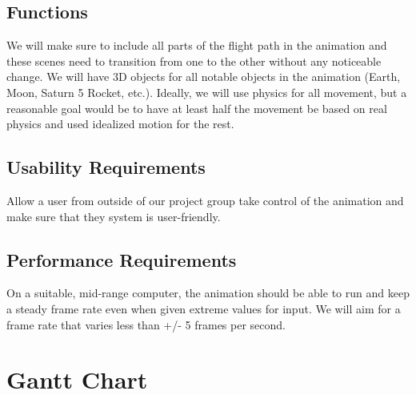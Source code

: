 \documentclass[onecolumn, draftclsnofoot,10pt, compsoc]{IEEEtran}
\begin{document}
    \subsection{Functions}
    We will make sure to include all parts of the flight path in the animation and these scenes need to transition from one to the other without any noticeable change. We will have 3D objects for all notable objects in the animation (Earth, Moon, Saturn 5 Rocket, etc.). Ideally, we will use physics for all movement, but a reasonable goal would be to have at least half the movement be based on real physics and used idealized motion for the rest.
    \subsection{Usability Requirements}
    Allow a user from outside of our project group take control of the animation and make sure that they system is user-friendly.
    \subsection{Performance Requirements}
    On a suitable, mid-range computer, the animation should be able to run and keep a steady frame rate even when given extreme values for input. We will aim for a frame rate that varies less than +/- 5 frames per second.
\section{Gantt Chart}
\end{document}
